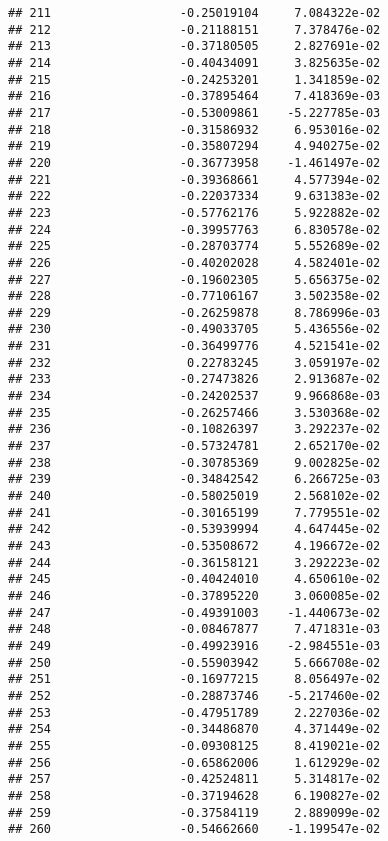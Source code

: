 \documentclass[
]{article}
\begin{document}
\begin{verbatim}
## 211                  -0.25019104     7.084322e-02
## 212                  -0.21188151     7.378476e-02
## 213                  -0.37180505     2.827691e-02
## 214                  -0.40434091     3.825635e-02
## 215                  -0.24253201     1.341859e-02
## 216                  -0.37895464     7.418369e-03
## 217                  -0.53009861    -5.227785e-03
## 218                  -0.31586932     6.953016e-02
## 219                  -0.35807294     4.940275e-02
## 220                  -0.36773958    -1.461497e-02
## 221                  -0.39368661     4.577394e-02
## 222                  -0.22037334     9.631383e-02
## 223                  -0.57762176     5.922882e-02
## 224                  -0.39957763     6.830578e-02
## 225                  -0.28703774     5.552689e-02
## 226                  -0.40202028     4.582401e-02
## 227                  -0.19602305     5.656375e-02
## 228                  -0.77106167     3.502358e-02
## 229                  -0.26259878     8.786996e-03
## 230                  -0.49033705     5.436556e-02
## 231                  -0.36499776     4.521541e-02
## 232                   0.22783245     3.059197e-02
## 233                  -0.27473826     2.913687e-02
## 234                  -0.24202537     9.966868e-03
## 235                  -0.26257466     3.530368e-02
## 236                  -0.10826397     3.292237e-02
## 237                  -0.57324781     2.652170e-02
## 238                  -0.30785369     9.002825e-02
## 239                  -0.34842542     6.266725e-03
## 240                  -0.58025019     2.568102e-02
## 241                  -0.30165199     7.779551e-02
## 242                  -0.53939994     4.647445e-02
## 243                  -0.53508672     4.196672e-02
## 244                  -0.36158121     3.292223e-02
## 245                  -0.40424010     4.650610e-02
## 246                  -0.37895220     3.060085e-02
## 247                  -0.49391003    -1.440673e-02
## 248                  -0.08467877     7.471831e-03
## 249                  -0.49923916    -2.984551e-03
## 250                  -0.55903942     5.666708e-02
## 251                  -0.16977215     8.056497e-02
## 252                  -0.28873746    -5.217460e-02
## 253                  -0.47951789     2.227036e-02
## 254                  -0.34486870     4.371449e-02
## 255                  -0.09308125     8.419021e-02
## 256                  -0.65862006     1.612929e-02
## 257                  -0.42524811     5.314817e-02
## 258                  -0.37194628     6.190827e-02
## 259                  -0.37584119     2.889099e-02
## 260                  -0.54662660    -1.199547e-02

\end{verbatim}
\end{document}
